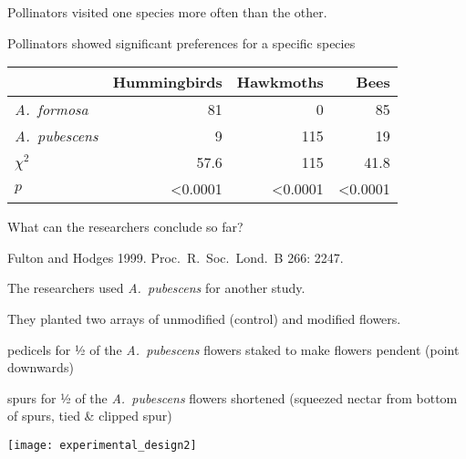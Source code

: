 \documentclass[t,handout]{beamer}  %
\begin{document}
\begin{frame}[t]{Pollinators visited one species more often than the other.}
\begin{multicols}{3}

	\end{multicols}
\end{frame}
%
\begin{frame}[t]{Pollinators showed significant preferences for a specific species}
		
	\begin{center}
	\begin{tabular}{lrrr}
	\toprule
		 	& Hummingbirds & Hawkmoths & Bees \tabularnewline
	\midrule
	\textit{A.~formosa}		&	81	&	0	&	85 \tabularnewline
	\textit{A.~pubescens}	&	9	&	115	&	19 \tabularnewline
	$\chi^2$				&	57.6	&	115	&	41.8 \tabularnewline
	$p$						&  \textless0.0001 & \textless0.0001 & \textless0.0001 \tabularnewline
	\bottomrule
	\end{tabular}
	\end{center}

	\hangpara What can the researchers conclude so far?

	\vfilll
	
	\hfill \tiny Fulton and Hodges 1999. Proc.~R.~Soc.~Lond.~B 266: 2247.
	
\end{frame}
%
\begin{frame}[t]{The researchers used \textit{A.~pubescens} for another study.}
	
	\vspace*{-\baselineskip}
	
	\hangpara They planted two arrays of unmodified (control) and modified flowers.

	\hangpara {} pedicels for ½ of the \textit{A.~pubescens} flowers staked to make flowers pendent (point downwards)
	
	\hangpara {} spurs for ½ of the \textit{A.~pubescens} flowers shortened (squeezed nectar from bottom of spurs, tied \& clipped spur)
	
	\centering
	\texttt{[image: experimental\_design2]}

\end{frame}
\end{document}
